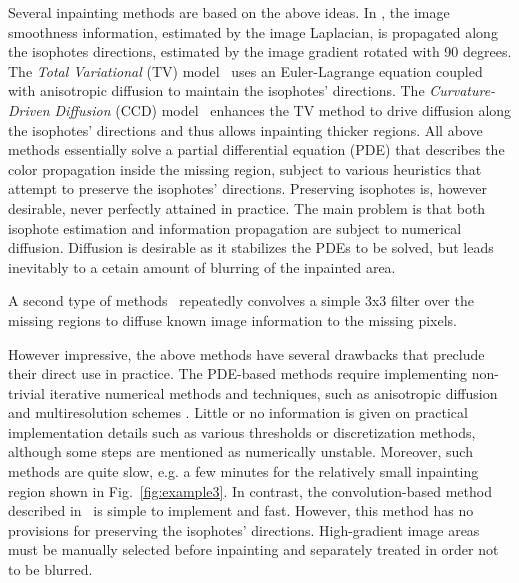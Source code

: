 \documentclass{llncs}
\begin{document}
Several inpainting methods are based on the above ideas.
In \cite{bertalmio1,bertalmio2}, the image smoothness
information, estimated by the image Laplacian, is propagated along the
isophotes directions, estimated by the image gradient rotated with 90
degrees. The \textit{Total Variational} (TV) model~\cite{chan} uses an
Euler-Lagrange equation coupled with anisotropic diffusion to maintain the
isophotes' directions. The \textit{Curvature-Driven Diffusion} (CCD)
model~\cite{chan2} enhances the TV method to drive diffusion along the isophotes' directions
and thus allows inpainting thicker regions. All above methods essentially 
solve a partial differential equation (PDE) that describes
the color propagation inside the missing region, subject to various
heuristics that attempt to preserve the
isophotes' directions. Preserving isophotes is, however desirable, never
perfectly attained in practice. The main problem is that both isophote
estimation and information propagation are subject to numerical diffusion.
Diffusion is desirable as it stabilizes the PDEs to be solved, but leads
inevitably to a cetain amount of blurring of the inpainted area.

A second type of methods~\cite{oliveira}
repeatedly convolves a simple 3x3 filter over the missing regions to
diffuse known image information to the missing pixels.
  
However impressive, the above methods have several drawbacks that preclude
their direct use in practice. The PDE-based methods require implementing non-trivial iterative numerical
methods and techniques, such as anisotropic diffusion and multiresolution schemes \cite{bertalmio1}.
Little or no information is given on practical implementation details such as various thresholds or
discretization methods, although some steps are mentioned as numerically unstable.
Moreover, such methods are quite slow, e.g. a few minutes for the relatively
small inpainting region shown in Fig.~\ref{fig:example3}.
In contrast, the convolution-based method described in~\cite{oliveira} 
is simple to implement and fast. However, this method has no provisions for
preserving the isophotes' directions.
High-gradient image areas must be manually selected before inpainting and
separately treated in order not to be blurred. 
\end{document}
